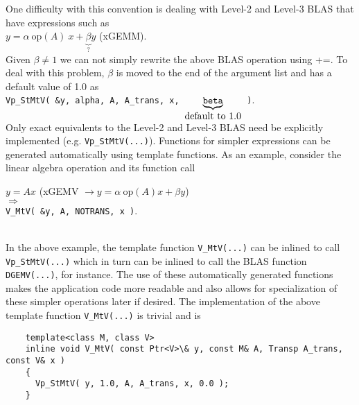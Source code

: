 \documentclass[acmtoms,acmnow]{acmtrans2m}
\begin{document}
One difficulty with this convention is dealing with Level-2 and Level-3 BLAS
that have expressions such as\\[1ex]

\hspace*{4ex}$y = \alpha \: \mbox{op}(A) \: x + \underbrace{\beta}_{
	\mbox{?} } y$ \hspace{4ex} (xGEMM).\\[1ex]

Given $\beta \neq 1$ we can not simply rewrite the above BLAS operation using
+=.  To deal with this problem, $\beta$ is moved to the end of the argument
list and has a default value of 1.0 as\\[1.0ex]

\hspace*{4ex}\texttt{Vp\_StMtV( \&y, alpha, A, A\_trans, x,
  $\underbrace{\mbox{\texttt{beta}}}_{\mbox{default to 1.0}}$ )}.\\[1.0ex]

Only exact equivalents to the Level-2 and Level-3 BLAS need be
explicitly implemented (e.g. {}\texttt{Vp\_StMtV(...)}).  Functions
for simpler expressions can be generated automatically using template
functions.  As an example, consider the linear algebra operation and
its function call\\[1.0ex]

{\bsinglespace
\hspace*{4ex}\parbox{\textwidth}{
$y = A x$ \hspace{4ex} (xGEMV $\rightarrow y = \alpha \: \mbox{op}(A) x + \beta y$)\\
$\Longrightarrow$\\
\texttt{V\_MtV( \&y, A, NOTRANS, x )}.
}
\esinglespace}\\[1.0ex]

In the above example, the template function {}\texttt{V\_MtV(...)} can be
inlined to call {}\texttt{Vp\_StMtV(...)} which in turn can be inlined to call
the BLAS function {}\texttt{DGEMV(...)}, for instance.  The use of these
automatically generated functions makes the application code more readable and
also allows for specialization of these simpler operations later if desired.
The implementation of the above template function {}\texttt{V\_MtV(...)} is
trivial and is

{\bsinglespace\small
\begin{verbatim}
    template<class M, class V>
    inline void V_MtV( const Ptr<V>\& y, const M& A, Transp A_trans, const V& x )
    {
      Vp_StMtV( y, 1.0, A, A_trans, x, 0.0 );
    }
\end{verbatim}
\esinglespace}
\end{document}
